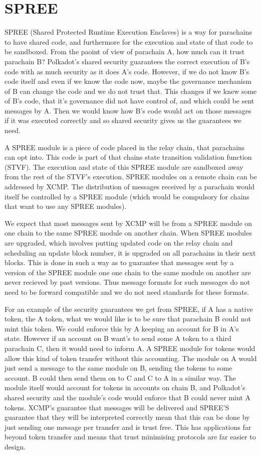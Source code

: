\section{SPREE}

SPREE (Shared Protected Runtime Execution Enclaves) is a way for parachains to have shared code, and furthermore for the execution and state of that code to be sandboxed. From the paoint of view of parachain A, how much can it trust parachain B? Polkadot's shared security guarantees the correct execution of B's code with as much security as it does A's code. However, if we do not know B's code itself and even if we know the code now, maybe the governance mechanism of B can change the code and we do not trust that. This changes if we knew some of B's code, that it's governance did not have control of, and which could be sent messages by A. Then we would know how B's code would act on those messages if it was executed correctly and so shared security gives us the guarantees we need.

A SPREE module is a piece of code placed in the relay chain, that parachains can opt into. This code is part of that chains state transition validation function (STVF). The execution and state of this SPREE module are sandboxed away from the rest of the STVF's execution. SPREE modules on a remote chain can be addressed by XCMP. The distribution of messages received by a parachain would itself be controlled by a SPREE module (which would be compulsory for chains that want to use any SPREE modules). 

We expect that most messages sent by XCMP will be from a SPREE module on one chain to the same SPREE module on another chain. When SPREE modules are upgraded, which involves putting updated code on the relay chain and scheduling an update block number, it is upgraded on all parachains in their next blocks. This is done in such a way as to guarantee that messages sent by a version of the SPREE module one one chain to the same module on another are never recieved by past versions. Thus message formats for such messages do not need to be forward compatible and we do not need standards for these formats.

For an example of the security guarantees we get from SPREE, if A has a native token, the A token, what we would like is to be sure that parachain B could not mint this token. We could enforce this by A keeping an account for B in A's state. However if an account on B want's to send some A token to a third parachain C, then it would need to inform A. A SPREE module for tokens would allow this kind of token transfer without this accounting. The module on A would just send a message to the same module on B, sending the tokens to some account. B could then send them on to C and C to A in a similar way. The module itself would account for tokens in accounts on chain B, and Polkadot's shared security and the module's code would enforce that B could never mint A tokens. XCMP's guarantee that messages will be delivered and SPREE'S guarantee that they will be interpreted correctly mean that this can be done by just sending one message per transfer and is trust free. This has applications far beyond token transfer and means that trust minimising protocols are far easier to design.

